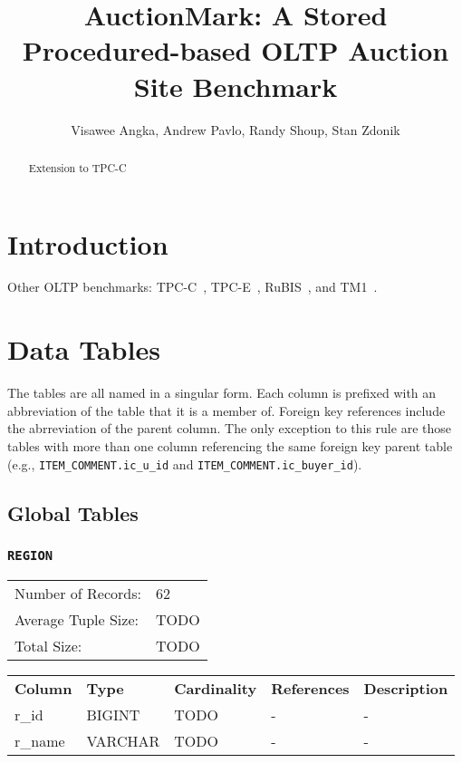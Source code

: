 \documentclass[a4paper,10pt]{article}
\title{AuctionMark: A Stored Procedured-based OLTP Auction Site Benchmark}
\author{Visawee Angka, Andrew Pavlo, Randy Shoup, Stan Zdonik}
\date{}
\begin{document}
\maketitle

\begin{abstract}
Extension to TPC-C

\end{abstract}

\section{Introduction}

Other OLTP benchmarks: TPC-C~\cite{tpc-c}, TPC-E~\cite{tpc-e}, RuBIS~\cite{rubis}, and TM1~\cite{tm1}.

\section{Data Tables}

The tables are all named in a singular form. Each column is prefixed with an abbreviation of the table that it is a member of. Foreign key references include the abrreviation of the parent column. The only exception to this rule are those tables with more than one column referencing the same foreign key parent table (e.g., \texttt{ITEM\_COMMENT.ic\_u\_id} and \texttt{ITEM\_COMMENT.ic\_buyer\_id}).

\subsection{Global Tables}

\subsubsection{\texttt{REGION}}

\begin{tabular}{ll}
Number of Records:      & 62 \\
Average Tuple Size:     & TODO \\
Total Size:             & TODO \\
\end{tabular}

\vspace*{0.1in}

\noindent \begin{tabular*}{\textwidth}{@{\extracolsep{\fill}} lllll}
\textbf{Column} & \textbf{Type} & \textbf{Cardinality} & \textbf{References} & \textbf{Description} \\
r\_id              & BIGINT     & TODO & -               & - \\
r\_name            & VARCHAR    & TODO & -               & - \\
\end{tabular*}
\end{document}
